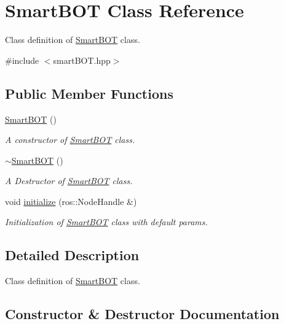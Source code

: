 \hypertarget{class_smart_b_o_t}{}\section{Smart\+B\+OT Class Reference}
\label{class_smart_b_o_t}


Class definition of \hyperlink{class_smart_b_o_t}{Smart\+B\+OT} class.  




{\ttfamily \#include $<$smart\+B\+O\+T.\+hpp$>$}

\subsection*{Public Member Functions}
\begin{DoxyCompactItemize}
\item 
\hyperlink{class_smart_b_o_t_ae8bbc24558d0381f4f788f9af79e62a7}{Smart\+B\+OT} ()
\begin{DoxyCompactList}\small\item\em A constructor of \hyperlink{class_smart_b_o_t}{Smart\+B\+OT} class. \end{DoxyCompactList}\item 
\hyperlink{class_smart_b_o_t_ab3b1ffa66d099fbc4428c65f85b804a2}{$\sim$\+Smart\+B\+OT} ()
\begin{DoxyCompactList}\small\item\em A Destructor of \hyperlink{class_smart_b_o_t}{Smart\+B\+OT} class. \end{DoxyCompactList}\item 
void \hyperlink{class_smart_b_o_t_a46e5da28de107e17662d493a43388795}{initialize} (ros\+::\+Node\+Handle \&)
\begin{DoxyCompactList}\small\item\em Initialization of \hyperlink{class_smart_b_o_t}{Smart\+B\+OT} class with default params. \end{DoxyCompactList}\end{DoxyCompactItemize}


\subsection{Detailed Description}
Class definition of \hyperlink{class_smart_b_o_t}{Smart\+B\+OT} class. 

\subsection{Constructor \& Destructor Documentation}
